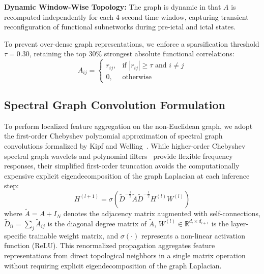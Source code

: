 \documentclass[journal]{IEEEtran}
\begin{document}
\noindent\textbf{Dynamic Window-Wise Topology:} The graph is dynamic in that $A$ is recomputed independently for each 4-second time window, capturing transient reconfiguration of functional subnetworks during pre-ictal and ictal states.

To prevent over-dense graph representations, we enforce a sparsification threshold $\tau = 0.30$, retaining the top $30\%$ strongest absolute functional correlations:
\begin{equation}
A_{ij} = \begin{cases}
r_{ij}, & \text{if } |r_{ij}| \ge \tau \text{ and } i \ne j \\
0, & \text{otherwise}
\end{cases}
\end{equation}

\subsection{Spectral Graph Convolution Formulation}
To perform localized feature aggregation on the non-Euclidean graph, we adopt the first-order Chebyshev polynomial approximation of spectral graph convolutions formalized by Kipf and Welling~\cite{kipf}. While higher-order Chebyshev spectral graph wavelets and polynomial filters~\cite{defferrard, hammond} provide flexible frequency responses, their simplified first-order truncation avoids the computationally expensive explicit eigendecomposition of the graph Laplacian at each inference step:
\begin{equation}
H^{(l+1)} = \sigma \left( \tilde{D}^{-\frac{1}{2}} \tilde{A} \tilde{D}^{-\frac{1}{2}} H^{(l)} W^{(l)} \right)
\end{equation}
where $\tilde{A} = A + I_N$ denotes the adjacency matrix augmented with self-connections, $\tilde{D}_{ii} = \sum_j \tilde{A}_{ij}$ is the diagonal degree matrix of $\tilde{A}$, $W^{(l)} \in \mathbb{R}^{d_l \times d_{l+1}}$ is the layer-specific trainable weight matrix, and $\sigma(\cdot)$ represents a non-linear activation function (ReLU). This renormalized propagation aggregates feature representations from direct topological neighbors in a single matrix operation without requiring explicit eigendecomposition of the graph Laplacian.
\end{document}
